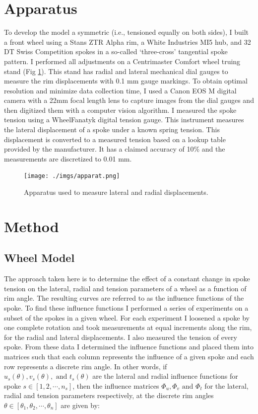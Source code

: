 \documentclass[journal]{IEEEtran}
\begin{document}
\section{Apparatus}
To develop the model a symmetric (i.e., tensioned equally on both sides), I built a front wheel using a Stans ZTR Alpha rim, a White Industries MI5 hub, and 32 DT Swiss Competition spokes in a so-called `three-cross' tangential spoke pattern.  I performed all adjustments on a Centrimaster Comfort wheel truing stand (Fig \ref{fig:apparatus}).  This stand has radial and lateral mechanical dial gauges to measure the rim displacements with 0.1 mm gauge markings. To obtain optimal resolution and minimize data collection time, I used a Canon EOS M digital camera with a 22mm focal length lens to capture images from the dial gauges and then digitized them with  a computer vision algorithm.  I measured the spoke tension using a WheelFanatyk digital tension gauge. This instrument measures the lateral displacement of a spoke under a known spring tension. This displacement is converted to a measured tension based on a lookup table provided by the manufacturer. It has a claimed accuracy of 10\% and the measurements are discretized to 0.01 mm.

\begin{figure}[!t]
\centering
\texttt{[image: ./imgs/apparat.png]}
\caption{Apparatus used to measure lateral and radial displacements.}
\label{fig:apparatus}
\end{figure}

\section{Method}

\subsection{Wheel Model}
The approach taken here is to determine the effect of a constant change in spoke tension on the lateral, radial and tension parameters of a wheel as a function of rim angle.  The resulting curves are referred to as the influence functions of the spoke. To find these influence functions I performed a series of experiments on a subset of the spokes in a given wheel.  For each experiment I loosened a spoke by one complete rotation and took measurements at equal increments along the rim, for the radial and lateral displacements.  I also measured the tension of every spoke. From these data I determined the influence functions and placed them into matrices such that each column represents the influence of a given spoke and each row represents a discrete rim angle.  In other words, if $u_s (\theta), v_s(\theta), \text{ and }t_s(\theta)$ are the lateral and radial influence functions for spoke $s \in [1,2, \cdots , n_s]$, then the influence matrices $\Phi_u, \Phi_v \text{ and } \Phi_t$  for the lateral, radial and tension parameters respectively, at the discrete rim angles $\theta \in [\theta_1,\theta_2,\cdots, \theta_n]$ are given by:
\end{document}
